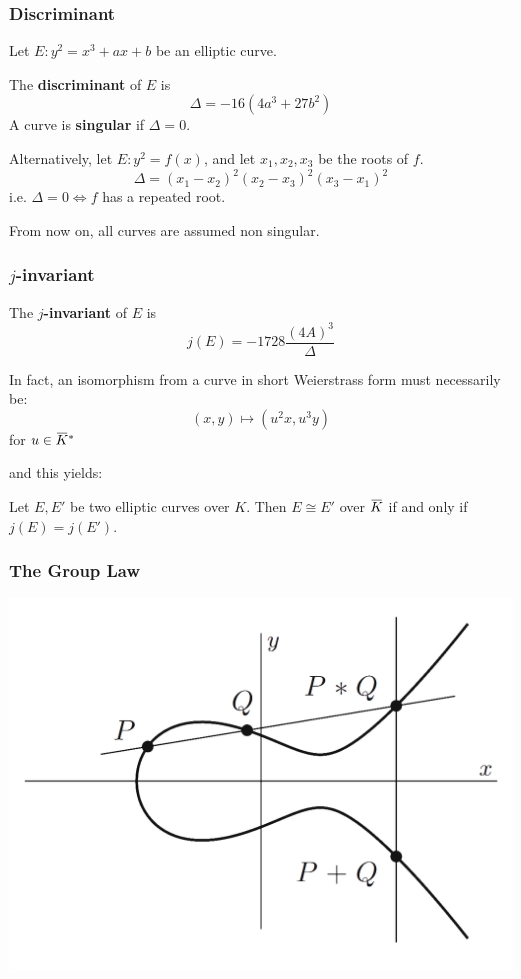 \documentclass{beamer}
\newcommand{\overbar}[1]{\mkern 1.5mu\overline{\mkern-1.5mu#1\mkern-1.5mu}\mkern 1.5mu}
\begin{document}
\begin{frame}
    \frametitle{Discriminant}
    \begin{definition}
        Let $E: y^2 = x^3 + a x + b$ be an elliptic curve.

        The \textbf{discriminant} of $E$ is 
            \[ \Delta = -16 (4 a^3 + 27 b^2) \] 
        A curve is \textbf{singular} if $\Delta = 0$.
   \end{definition}
   
    Alternatively, let $E: y^2 = f(x)$, and let $x_1, x_2, x_3$ be the roots of $f$. 
    \[ \Delta = (x_1 - x_2)^2(x_2 - x_3)^2(x_3 - x_1)^2 \]
    i.e. $\Delta = 0 \iff f$ has a repeated root.

    
    From now on, all curves are assumed non singular.
    
\end{frame}

\begin{frame}
    \frametitle{$j$-invariant}
    \begin{definition}
         The $j$\textbf{-invariant} of $E$ is
            \[ j(E) = -1728 \frac{(4 A)^3}{\Delta} \]
    \end{definition} 
    
    In fact, an isomorphism from a curve in short Weierstrass form must necessarily be:
    \[ (x, y) \mapsto (u^2 x, u^3 y) \]
    for $u \in \overbar{K}^*$ 
     
    and this yields:
     \begin{theorem}
        Let $E, E'$ be two elliptic curves over $K$. Then $E \cong E'$ over $\overbar{K}$ if and only if $j(E) = j(E')$. 
    \end{theorem}  
\end{frame}

\begin{frame}
    \frametitle{The Group Law} 
    \begin{center}
        \includegraphics[width=20 em]{group_law.png}
    \end{center}
\end{frame}
\end{document}
